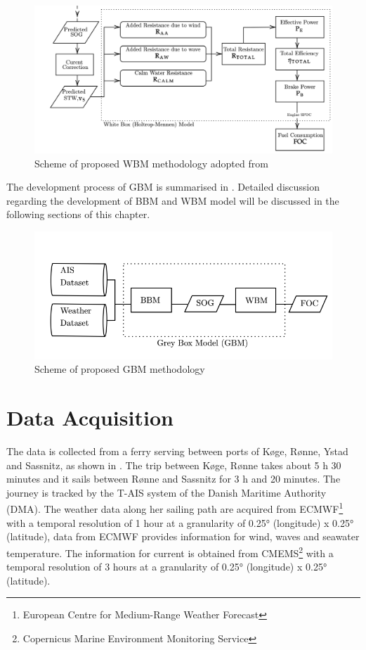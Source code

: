\begin{figure}[h]
    \centering
        \includegraphics[width=\textwidth]{02_figures/flowmethod_WBM.png}
        \caption{Scheme of proposed WBM methodology adopted from }
        \label{fig:flowchart_WBM}
\end{figure}

The development process of GBM is summarised in . Detailed discussion regarding the development of BBM and WBM model will be discussed in the following sections of this chapter.

\begin{figure}[h]
    \centering
        \includegraphics[width=.85\textwidth]{02_figures/flowmethod_GBM_alt.png}
        \caption{Scheme of proposed GBM methodology}
        \label{fig:flowchart_GBM}
\end{figure}

\pagebreak

\section{Data Acquisition}\label{sec:data_acquisition}

The data is collected from a ferry serving between ports of K{\o}ge, R{\o}nne, Ystad and Sassnitz, as shown in  . The trip between K{\o}ge, R{\o}nne takes about 5 h 30 minutes and it sails between R{\o}nne and Sassnitz for 3 h and 20 minutes. The journey is tracked by the T-AIS system of the Danish Maritime Authority (DMA). The weather data along her sailing path are acquired from ECMWF\footnote{European Centre for Medium-Range Weather Forecast} with a temporal resolution of 1 hour at a granularity of 0.25° (longitude) x 0.25° (latitude), data from ECMWF provides information for wind, waves and seawater temperature. The information for current is obtained from CMEMS\footnote{Copernicus Marine Environment Monitoring Service} with a temporal resolution of 3 hours at a granularity of  0.25° (longitude) x 0.25° (latitude).\\ 


